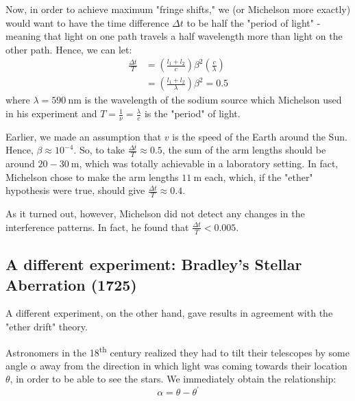 \documentclass[a4paper,11pt]{article}
\numberwithin{equation}{section}
\begin{document}
 \noindent Now, in order to achieve maximum "fringe shifts," we (or Michelson more exactly) would want to have the time difference $\Delta t$ to be half the "period of light" - meaning that light on one path travels a half wavelength more than light on the other path. Hence, we can let:
 \begin{equation}\label{eq:2.14}
 \begin{split}
 \frac{\Delta t}{T}&=\left(\frac{l_{1}+l_{2}}{c}\right){\beta}^{2}\left(\frac{c}{\lambda}\right) \\
 &=\left(\frac{l_{1}+l_{2}}{\lambda}\right){\beta}^{2}=0.5
 \end{split}
 \end{equation}
 where $\lambda = \SI{590}{\nano\meter}$ is the wavelength of the sodium source which Michelson used in his experiment and $T=\frac{1}{\nu}=\frac{\lambda}{c}$ is the "period" of light.
 
 \noindent Earlier, we made an assumption that $v$ is the speed of the Earth around the Sun. Hence, $\beta\approx 10^{-4}$. So, to take $\frac{\Delta t}{T} \approx 0.5$, the sum of the arm lengths should be around $20-30 \SI{}{\meter}$, which was totally achievable in a laboratory setting. In fact, Michelson chose to make the arm lengths $\SI{11}{\meter}$ each, which, if the "ether" hypothesis were true, should give $\frac{\Delta t}{T} \approx 0.4$. 
 
 \noindent As it turned out, however, Michelson did not detect any changes in the interference patterns. In fact, he found that $\frac{\Delta t}{T} <  0.005$.
 
 \subsection{A different experiment: Bradley's Stellar Aberration (1725)}
 A different experiment, on the other hand, gave results in agreement with the "ether drift" theory. 
 
 \noindent Astronomers in the 18\textsuperscript{th} century realized they had to tilt their telescopes by some angle $\alpha$ away from the direction in which light was coming towards their location $\theta$, in order to be able to see the stars. We immediately obtain the relationship:
 \begin{equation} \label{eq:2.15}
 \alpha = \theta - {\theta}^{\prime}
 \end{equation}
 
\end{document}
